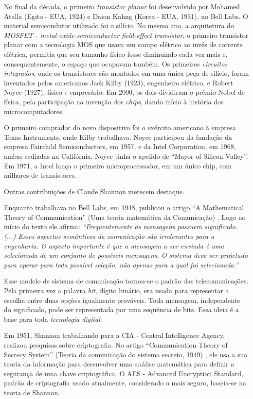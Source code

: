 \documentclass{hipatia}
\begin{document}
No final da década, o primeiro \textit{transistor planar} foi desenvolvido por Mohamed Atalla (Egito - EUA, 1924) e Daion Kahng (Korea - EUA, 1931), no Bell Labs. O material semicondutor utilizado foi o silício. No mesmo ano, a arquitetura do \textit{MOSFET - metal-oxide-semiconductor field-effect transistor}, o primeiro transistor planar com a tecnologia MOS que usava um campo elétrico ao invés de corrente elétrica,  permitia que seu tamanho físico fosse diminuindo cada vez mais e, consequentemente, o espaço que ocupavam também.
Os primeiros \textit{circuitos integrados}, onde os transistores são montados em uma única peça de silício, foram inventados pelos americanos Jack Kilby (1923), engenheiro elétrico, e Robert Noyce (1927), físico e empresário. Em 2000, os dois dividiram o prêmio Nobel de física, pela participação na invenção dos \textit{chips}, dando início à história dos microcomputadores.

O primeiro comprador do novo dispositivo foi o exército americano à empresa Texas Instruments, onde Kilby trabalhava. Noyce participou da fundação da empresa Fairchild Semiconductors, em 1957, e da Intel Corporation, em 1968, ambas sediadas na Califórnia. Noyce tinha o apelido de ``Mayor of Silicon Valley''. Em 1971, a Intel lança o primeiro microprocessador, em um único chip, com milhares de transistores.

Outras contribuições de Claude Shannon merecem destaque.

Enquanto trabalhava no Bell Labs, em 1948, publicou o artigo ``A Mathematical Theory of Communication'' (Uma teoria matemática da Comunicação) \cite{Shannon1948}. Logo no início do texto ele afirma: \textit{``Frequentemente as mensagens possuem significado. (...) Esses aspectos semânticos da comunicação são irrelevantes para a engenharia. O aspecto importante é que a mensagem a ser enviada é uma selecionada de um conjunto de possíveis mensagens. O sistema deve ser projetado para operar para toda possível seleção, não apenas para a qual foi selecionada.''}

Esse modelo de sistema de comunicação tornou-se o padrão das telecomunicações. Pela primeira vez a palavra \textit{bit}, dígito binário, era usada para representar a escolha entre duas opções igualmente prováveis. Toda mensagem, independente do significado, pode ser representada por uma sequência de bits. Essa ideia é a base para toda \textit{tecnologia digital}.

Em 1951, Shannon trabalhando para a CIA - Central Intelligence Agency, realizou pesquisas sobre criptografia. No artigo ``Communication Theory of Secrecy System'' (Teoria da comunicação do sistema secreto, 1949) \cite{Shannon1949}, ele usa a sua teoria da informação para desenvolver uma análise matemática para definir a segurança de uma chave criptográfica. O AES - Advanced Encryption Standard, padrão de criptografia usado atualmente, considerado o mais seguro, baseia-se na teoria de Shannon.
\end{document}
